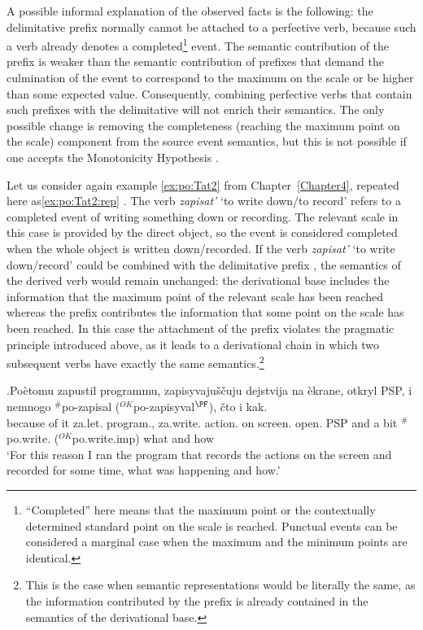 A possible informal explanation of the observed facts is the following: the delimitative prefix  normally cannot be attached to a perfective verb, because such a verb already denotes a completed\footnote{``Completed'' here means that the maximum point or the contextually determined standard point on the scale is reached. Punctual events can be considered a marginal case when the maximum and the minimum points are identical.} event. The semantic contribution of the prefix  is weaker than the semantic contribution of prefixes that demand the culmination of the event to correspond to the maximum on the scale or be higher than some expected value. Consequently, combining perfective verbs that contain such prefixes with the delimitative  will not enrich their semantics. The only possible change is removing the completeness (reaching the maximum point on the scale) component from the source event semantics, but this is not possible if one accepts the Monotonicity Hypothesis \citep{Kiparsky:82}.

Let us consider again example \ref{ex:po:Tat2} from Chapter~\ref{Chapter4}, repeated here as\ref{ex:po:Tat2:rep} \citet{Tatevosov:09}. The verb \textit{zapisat'} `to write down/to record' refers to a completed event of writing something down or recording. The relevant scale in this case is provided by the direct object, so the event is considered completed when the whole object is written down/recorded. If the verb \textit{zapisat'} `to write down/record' could be combined with the delimitative prefix , the semantics of the derived verb would remain unchanged: the derivational base includes the information that the maximum point of the relevant scale has been reached whereas the prefix contributes the information that some point on the scale has been reached. In this case the attachment of the prefix violates the pragmatic principle introduced above, as it leads to a derivational chain in which two subsequent verbs have exactly the same semantics.\footnote{This is the case when semantic representations would be literally the same, as the information contributed by the prefix is already contained in the semantics of the derivational base.}

\exg.\label{ex:po:Tat2:rep}Po\`{e}tomu zapustil programmu, zapisyvaju\v{s}\v{c}uju dejstvija na \`{e}krane, otkryl PSP, i nemnogo $^\#$po-zapisal ($^{\textit{OK}}$po-zapisyval$^{\PF}$), \v{c}to i kak.\\
{because of it} za.let. program., za.write. action. on screen. open. PSP and {a bit} $^\#$po.write. ($^{\textit{OK}}$po.write.imp) what and how\\
\trans `For this reason I ran the program that records the actions on the screen and recorded for some time, what was happening and how.'\\ 


